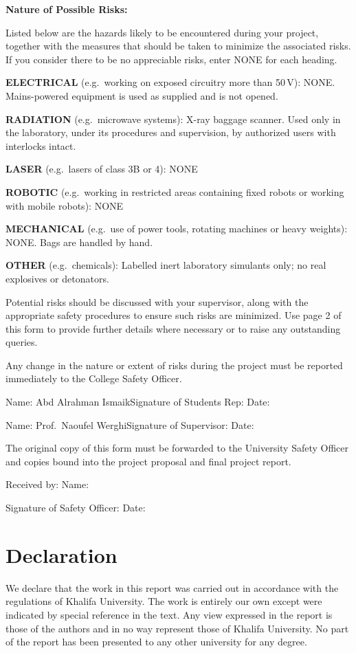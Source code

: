 \textbf{Nature of Possible Risks:}

Listed below are the hazards likely to be encountered during your project, together with the measures that should be taken to minimize
the associated risks. If you consider there to be no appreciable risks, enter NONE for each heading.

\textbf{ELECTRICAL} (e.g.\ working on exposed circuitry more than 50\,V): NONE. Mains-powered equipment is used as supplied and is not opened.

\textbf{RADIATION} (e.g.\ microwave systems): X-ray baggage scanner. Used only in the laboratory, under its procedures and supervision, by
authorized users with interlocks intact.

\textbf{LASER} (e.g.\ lasers of class 3B or 4): NONE

\textbf{ROBOTIC} (e.g.\ working in restricted areas containing fixed robots or working with mobile robots): NONE

\textbf{MECHANICAL} (e.g.\ use of power tools, rotating machines or heavy weights): NONE. Bags are handled by hand.

\textbf{OTHER} (e.g.\ chemicals): Labelled inert laboratory simulants only; no real explosives or detonators.

Potential risks should be discussed with your supervisor, along with the appropriate safety procedures to ensure such risks are minimized.
Use page 2 of this form to provide further details where necessary or to raise any outstanding queries.

Any change in the nature or extent of risks during the project must be reported immediately to the College Safety Officer.

\medskip
Name: Abd Alrahman Ismaik\quad Signature of Students Rep: \sigA\hfill Date: \sigdate

\medskip
Name: Prof.\ Naoufel Werghi\quad Signature of Supervisor: \sigS\hfill Date: \sigdate

The original copy of this form must be forwarded to the University Safety Officer and copies bound into the project proposal and final
project report.

\medskip
Received by: Name: \sigOname\par
Signature of Safety Officer: \sigO\hfill Date: \sigdate
\endgroup

\clearpage
\section{Declaration}\label{sec:declaration}
We declare that the work in this report was carried out in accordance with the
regulations of Khalifa University. The work is entirely our own except were indicated by
special reference in the text. Any view expressed in the report is those of the authors
and in no way represent those of Khalifa University. No part of the report has been
presented to any other university for any degree.

